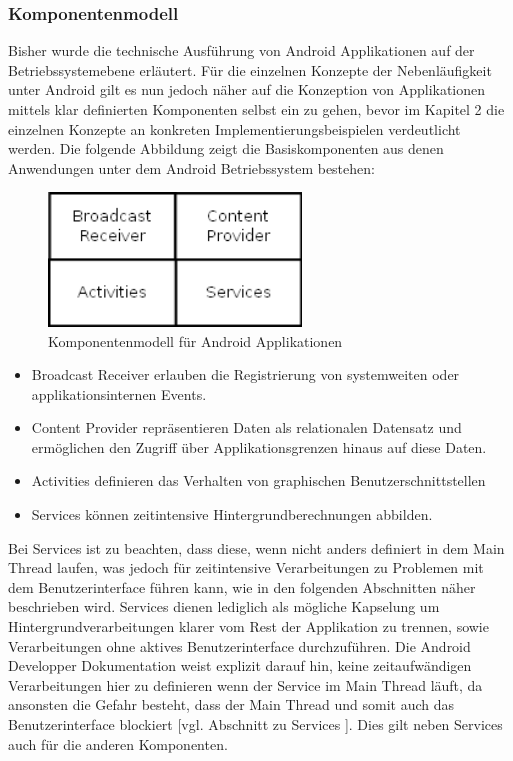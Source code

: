 \documentclass[12pt,oneside,a4paper,bibtotoc,liststotoc]{scrreprt}
\begin{document}
\subsubsection{Komponentenmodell}
Bisher wurde die technische Ausführung von Android Applikationen auf der Betriebssystemebene erläutert. Für die einzelnen Konzepte der Nebenläufigkeit unter Android gilt es nun jedoch näher auf die Konzeption von Applikationen mittels klar definierten Komponenten selbst ein zu gehen, bevor im Kapitel 2 die einzelnen Konzepte an konkreten Implementierungsbeispielen verdeutlicht werden. Die folgende Abbildung zeigt die Basiskomponenten aus denen Anwendungen unter dem Android Betriebssystem bestehen:
\begin{figure}[H]
  \begin{centering}
    \includegraphics[width=0.6\textwidth]{img/Android_Komponent_Model.png}
    \caption{Komponentenmodell für Android Applikationen}
    \label{Android_Komponent_Model}
  \end{centering}
\end{figure}
\begin{itemize}
\item Broadcast Receiver erlauben die Registrierung von systemweiten oder applikationsinternen Events.
\item Content Provider repräsentieren Daten als relationalen Datensatz und ermöglichen den Zugriff über Applikationsgrenzen hinaus auf diese Daten.
\item Activities definieren das Verhalten von graphischen Benutzerschnittstellen
\item Services können zeitintensive Hintergrundberechnungen abbilden. 
\end{itemize}
Bei Services ist zu beachten, dass diese, wenn nicht anders definiert in dem Main Thread laufen, was jedoch für zeitintensive Verarbeitungen zu Problemen mit dem Benutzerinterface führen kann, wie in den folgenden Abschnitten näher beschrieben wird. Services dienen lediglich als mögliche Kapselung um Hintergrundverarbeitungen klarer vom Rest der Applikation zu trennen, sowie Verarbeitungen ohne aktives Benutzerinterface durchzuführen. Die Android Developper Dokumentation weist explizit darauf hin, keine zeitaufwändigen Verarbeitungen hier zu definieren wenn der Service im Main Thread läuft, da ansonsten die Gefahr besteht, dass der Main Thread und somit auch das Benutzerinterface blockiert [vgl. Abschnitt zu Services \citet{androidDevDocu}]. Dies gilt neben Services auch für die anderen Komponenten.
\end{document}
